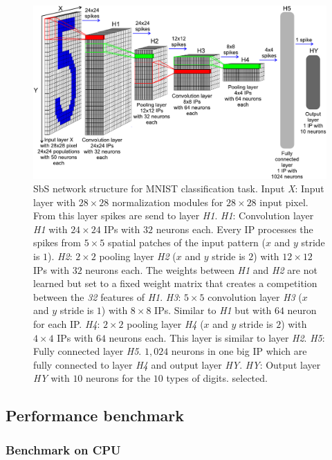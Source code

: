 \begin{figure}[!h]
	\includegraphics[width=\columnwidth]{../figures/sbs_network.pdf}
	\caption{SbS network structure for MNIST classification task.
		Input \emph{X}: Input layer with $28\times28$ normalization modules for $28\times28$ input pixel. From this layer spikes are send to layer \emph{H1}. \emph{H1}: Convolution layer \emph{H1} with $24\times24$ IPs with $32$ neurons each. Every IP processes the spikes from $5\times5$ spatial patches of the input pattern ($x$ and $y$ stride is $1$). \emph{H2}: $2\times2$ pooling layer \emph{H2} ($x$ and $y$ stride is $2$) with $12\times12$ IPs with $32$ neurons each. The weights between \emph{H1} and \emph{H2} are not learned but set to a fixed weight matrix that creates a competition between the \emph{32} features of \emph{H1}. \emph{H3}: $5\times5$ convolution layer \emph{H3} ($x$ and $y$ stride is $1$) with $8\times8$ IPs. Similar to \emph{H1} but with $64$ neuron  	for each IP. \emph{H4}: $2\times2$ pooling layer \emph{H4} ($x$ and $y$ stride is $2$) with $4\times4$ IPs with $64$ neurons each. This layer is similar to layer \emph{H2}. \emph{H5}: Fully connected layer \emph{H5}. $1,024$ neurons in one big IP which are fully connected to layer \emph{H4} and output layer \emph{HY}. \emph{HY}: Output layer \emph{HY} with $10$ neurons for the $10$ types of digits. selected.}\label{fig:sbs_network}
\end{figure}



\subsection{Performance benchmark}
\subsubsection{Benchmark on CPU}

